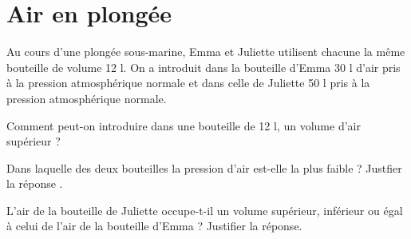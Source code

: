 \section{Air en plongée}

Au cours d'une plongée sous-marine, Emma et Juliette utilisent chacune la même bouteille de volume 12 l.
On a introduit dans la bouteille d'Emma 30 l d'air pris à la pression atmosphérique normale et dans celle de Juliette 50 l pris à la pression atmosphérique normale.

\begin{questions}
	\question Comment peut-on introduire dans une bouteille de 12 l, un volume d'air supérieur ?
	\fillwithdottedlines{2cm}
	
	\question Dans laquelle des deux bouteilles la pression d'air est-elle la plus faible ? Justfier la réponse
		.
	\fillwithdottedlines{2.5cm}
		

	\question L'air de la bouteille de Juliette occupe-t-il un volume supérieur, inférieur ou égal à celui de l'air de la bouteille d'Emma ? Justifier la réponse.
	
	\fillwithdottedlines{2.5cm}
\end{questions}